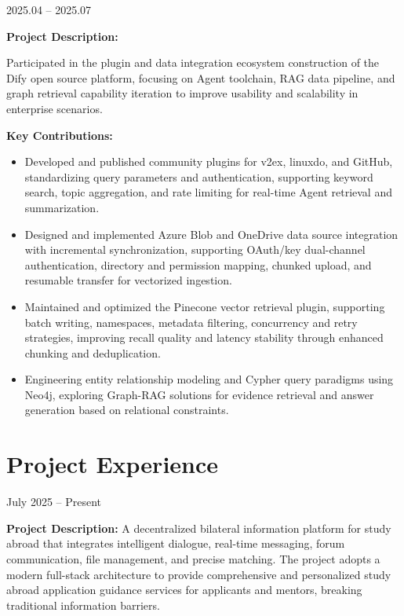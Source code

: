 \documentclass{resume}
\begin{document}
 {2025.04 -- 2025.07}

\textbf{Project Description:}

Participated in the plugin and data integration ecosystem construction of the Dify open source platform, focusing on Agent toolchain, RAG data pipeline, and graph retrieval capability iteration to improve usability and scalability in enterprise scenarios.

\textbf{Key Contributions:}
\begin{itemize}
    \item Developed and published community plugins for v2ex, linuxdo, and GitHub, standardizing query parameters and authentication, supporting keyword search, topic aggregation, and rate limiting for real-time Agent retrieval and summarization.
    \item Designed and implemented Azure Blob and OneDrive data source integration with incremental synchronization, supporting OAuth/key dual-channel authentication, directory and permission mapping, chunked upload, and resumable transfer for vectorized ingestion.
    \item Maintained and optimized the Pinecone vector retrieval plugin, supporting batch writing, namespaces, metadata filtering, concurrency and retry strategies, improving recall quality and latency stability through enhanced chunking and deduplication.
    \item Engineering entity relationship modeling and Cypher query paradigms using Neo4j, exploring Graph-RAG solutions for evidence retrieval and answer generation based on relational constraints.
\end{itemize}

\vspace{-1.8ex}
\section{Project Experience}
 {July 2025 -- Present}

\textbf{Project Description:}
A decentralized bilateral information platform for study abroad that integrates intelligent dialogue, real-time messaging, forum communication, file management, and precise matching. The project adopts a modern full-stack architecture to provide comprehensive and personalized study abroad application guidance services for applicants and mentors, breaking traditional information barriers.
\end{document}

